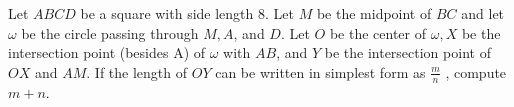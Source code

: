 Let $ABCD$ be a square with side length $8$. Let $M$ be the midpoint of $BC$ and let  $\omega$ be the circle passing through $M, A$, and $D$. Let $O$ be the center of $\omega, X$ be the intersection point (besides A) of $\omega$ with $AB$, and $Y$ be the intersection point of $OX$ and $AM$. If the length of $OY$ can be written in simplest form as $\frac{m}{n}$ , compute $m + n$.